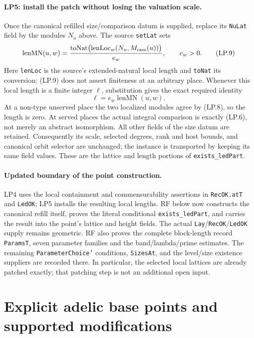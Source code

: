 \documentclass[11pt,a4paper]{article}
\numberwithin{equation}{section}
\theoremstyle{remark}\newtheorem{remark}[theorem]{Remark}
\begin{document}
\paragraph{LP5: install the patch without losing the valuation scale.}
Once the canonical refilled size/comparison datum is supplied, replace
its \texttt{NuLat} field by the modules $N_u$ above. The source
\texttt{setLat} sets
\[
 \operatorname{lenMN}(u,w)
  =\frac{\operatorname{toNat}\bigl(\operatorname{lenLoc}_w
                                      (N_u,M_{\rm ram}(u))\bigr)}{e_w},
              \qquad e_w>0.                                  \tag{LP.9}
\]
Here \texttt{lenLoc} is the source's extended-natural local length
and \texttt{toNat} its conversion; (LP.9) does not assert finiteness
at an arbitrary place. Whenever this local length is a finite integer
$\ell$, substitution gives the exact required identity
\[
                   \ell=e_w\operatorname{lenMN}(u,w).           \tag{LP.10}
\]
At a non-type unserved place the two localized modules agree by
(LP.8), so the length is zero. At served places the actual integral
comparison is exactly (LP.6), not merely an abstract isomorphism.
All other fields of the size datum are retained. Consequently its
scale, selected degrees, rank and host bounds, and canonical orbit
selector are unchanged; the instance is transported by keeping its
same field values. These are the lattice and length portions of
\texttt{exists\_ledPart}.

\paragraph{Updated boundary of the point construction.}
LP4 uses the local containment and commensurability assertions in
\texttt{RecOK.atT} and \texttt{LedOK}; LP5 installs the resulting
local lengths. RF below now constructs the canonical refill itself,
proves the literal conditional \texttt{exists\_ledPart}, and carries
the result into the point's lattice and height fields. The actual
\texttt{Lay}/\texttt{RecOK}/\texttt{LedOK} supply remains geometric.
RF also proves the complete block-length record \texttt{ParamsT}, seven
parameter families and the band/lambda/prime estimates. The remaining
\texttt{ParameterChoice'} conditions, \texttt{SizesAt}, and the
level/size existence suppliers are recorded there. In particular,
the selected local lattices are already patched exactly; that
patching step is not an additional open input.

\section{Explicit adelic base points and supported modifications}
\label{sec:adelic-geometry}
\end{document}
